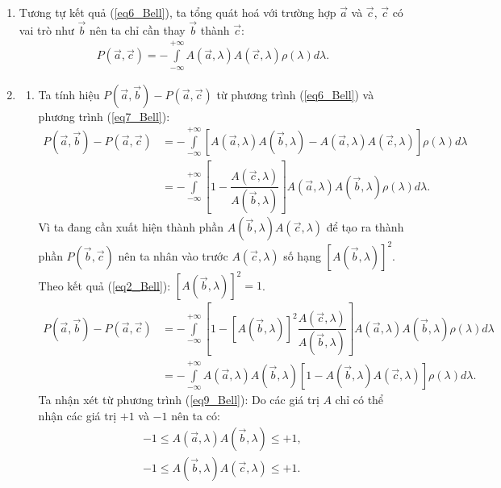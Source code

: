 \begin{enumerate}
\begin{enumerate}[label=\textbf{\alph*,}]
\begin{enumerate}
    \end{enumerate}
    \item Tương tự kết quả (\ref{eq6_Bell}), ta tổng quát hoá với trường hợp $\Vec{a}$ và $\Vec{c}$, $\Vec{c}$ có vai trò như $\Vec{b}$ nên ta chỉ cần thay $\Vec{b}$ thành $\Vec{c}$:
\begin{align} \label{eq7_Bell}
    P(\Vec{a},\Vec{c})=-\displaystyle\int\limits_{-\infty}^{+\infty}A(\Vec{a},\lambda)A(\Vec{c},\lambda)\rho(\lambda)d\lambda.
\end{align}
    \item \begin{enumerate}
        \item Ta tính hiệu $P(\Vec{a},\Vec{b})-P(\Vec{a},\Vec{c})$ từ phương trình (\ref{eq6_Bell}) và phương trình (\ref{eq7_Bell}):
\begin{align}
    P(\Vec{a},\Vec{b})-P(\Vec{a},\Vec{c})&=-\displaystyle\int\limits_{-\infty}^{+\infty}\left[A(\Vec{a},\lambda)A(\Vec{b},\lambda)-A(\Vec{a},\lambda)A(\Vec{c},\lambda)\right]\rho(\lambda)d\lambda\nonumber \\
    \label{eq8_Bell}
    &=-\displaystyle\int\limits_{-\infty}^{+\infty}\left[1-\dfrac{A(\Vec{c},\lambda)}{A(\Vec{b},\lambda)}\right]A(\Vec{a},\lambda)A(\Vec{b},\lambda)\rho(\lambda)d\lambda.
\end{align}
Vì ta đang cần xuất hiện thành phần $A(\Vec{b},\lambda)A(\Vec{c},\lambda)$ để tạo ra thành phần $P(\Vec{b},\Vec{c})$ nên ta nhân vào trước $A(\Vec{c},\lambda)$ số hạng $\left[A(\Vec{b},\lambda)\right]^2$. Theo kết quả (\ref{eq2_Bell}): $\left[A(\Vec{b},\lambda)\right]^2=1$.
\begin{align}
    P(\Vec{a},\Vec{b})-P(\Vec{a},\Vec{c})&=-\displaystyle\int\limits_{-\infty}^{+\infty}\left[1-\left[A(\Vec{b},\lambda)\right]^2\dfrac{A(\Vec{c},\lambda)}{A(\Vec{b},\lambda)}\right]A(\Vec{a},\lambda)A(\Vec{b},\lambda)\rho(\lambda)d\lambda \nonumber \\
    \label{eq9_Bell}
    &=-\displaystyle\int\limits_{-\infty}^{+\infty}A(\Vec{a},\lambda)A(\Vec{b},\lambda)\left[1-A(\Vec{b},\lambda)A(\Vec{c},\lambda)\right]\rho(\lambda)d\lambda.
\end{align}
Ta nhận xét từ phương trình (\ref{eq9_Bell}): Do các giá trị $A$ chỉ có thể nhận các giá trị $+1$ và $-1$ nên ta có:
\begin{align}
    \label{eq10_Bell}
    -1 \leq A(\Vec{a},\lambda)A(\Vec{b},\lambda) \leq + 1, \\
    \label{eq11_Bell}
    -1 \leq A(\Vec{b},\lambda)A(\Vec{c},\lambda) \leq + 1.
\end{align}

\end{enumerate}
\end{enumerate}
\end{enumerate}
